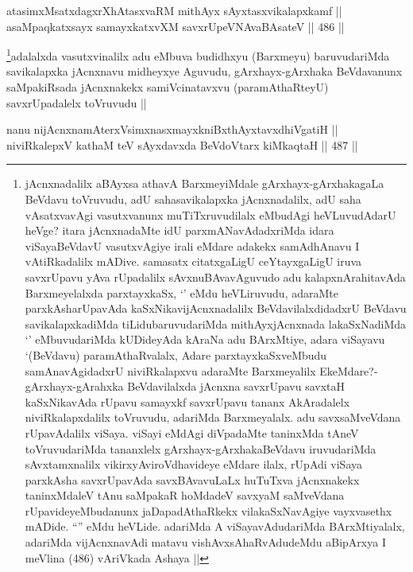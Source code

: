 \begin{shl}
atasimxMsatxdagxrXhAtasxvaRM mithAyx sAyxtasxvikalapxkamf || \\
asaMpaqkatxsayx samayxkatxvXM savxrUpeVNAvaBAsateV ||  486 ||  
\end{shl}

\begin{artha}
\footnote{jAcnxnadalilx aBAyxsa athavA BarxmeyiMdale gArxhayx-gArxhakagaLa BeVdavu toVruvudu, adU sahasavikalapxka jAcnxnadalilx, adU saha vAsatxvavAgi vasutxvanunx muTiTxruvudilalx eMbudAgi heVLuvudAdarU heVge? itara jAcnxnadaMte idU parxmANavAdadxriMda idara viSayaBeVdavU vasutxvAgiye irali eMdare adakekx samAdhAnavu I vAtiRkadalilx mADive. samasatx citatxgaLigU ceYtayxgaLigU iruva savxrUpavu yAva rUpadalilx sAvxnuBAvavAguvudo adu kalapxnArahitavAda Barxmeyelalxda parxtayxkaSx, `\stext' eMdu heVLiruvudu, adaraMte parxkAsharUpavAda kaSxNikavijAcnxnadalilx BeVdavilalxdidadxrU BeVdavu savikalapxkadiMda tiLidubaruvudariMda mithAyxjAcnxnada lakaSxNadiMda `\stext' eMbuvudariMda kUDideyAda kAraNa adu BArxMtiye, adara viSayavu `(BeVdavu) paramAthaRvalalx, Adare parxtayxkaSxveMbudu samAnavAgidadxrU niviRkalapxvu adaraMte Barxmeyalilx EkeMdare?- gArxhayx-gArahxka BeVdavilalxda jAcnxna savxrUpavu savxtaH kaSxNikavAda rUpavu samayxkf savxrUpavu tananx AkAradalelx niviRkalapxdalilx toVruvudu, adariMda Barxmeyalalx. adu savxsaMveVdana rUpavAdalilx viSaya. viSayi eMdAgi diVpadaMte taninxMda tAneV toVruvudariMda tananxlelx gArxhayx-gArxhakaBeVdavu iruvudariMda sAvxtamxnalilx vikirxyAviroVdhavideye eMdare ilalx, rUpAdi viSaya parxkAsha savxrUpavAda savxBAvavuLaLx huTuTxva jAcnxnakekx taninxMdaleV tAnu saMpakaR hoMdadeV savxyaM saMveVdana rUpavideyeMbudanunx jaDapadAthaRkekx vilakaSxNavAgiye vayxvasethx mADide. ``\stext'' eMdu heVLide. adariMda A viSayavAdudariMda BArxMtiyalalx, adariMda vijAcnxnavAdi matavu vishAvxsAhaRvAdudeMdu aBipArxya I meVlina (486) vAriVkada Ashaya ||}adalalxda vasutxvinalilx adu eMbuva budidhxyu (Barxmeyu) baruvudariMda savikalapxka jAcnxnavu midheyxye Aguvudu, gArxhayx-gArxhaka BeVdavanunx saMpakiRsada jAcnxnakekx samiVcinatavxvu (paramAthaRteyU) savxrUpadalelx toVruvudu ||
\end{artha}


\begin{shl}
nanu nijAcnxnamAterxV\s simxnasxmayxkniBxthAyxtavxdhiVgatiH || \\
niviRkalepxV kathaM teV sAyxdavxda BeVdoV\s tarx kiMkaqtaH ||  487 ||  
\end{shl}
				
